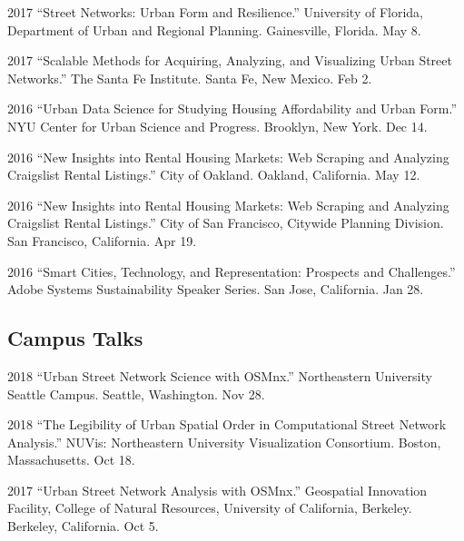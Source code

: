 \documentclass[12pt,letterpaper]{report}
\begin{document}
\begin{tablist}
		\item[2017] \tab \enquote{Street Networks: Urban Form and Resilience.} University of Florida, Department of Urban and Regional Planning. Gainesville, Florida. May 8.

		\item[2017] \tab \enquote{Scalable Methods for Acquiring, Analyzing, and Visualizing Urban Street Networks.} The Santa Fe Institute. Santa Fe, New Mexico. Feb 2.

		\item[2016] \tab \enquote{Urban Data Science for Studying Housing Affordability and Urban Form.} NYU Center for Urban Science and Progress. Brooklyn, New York. Dec 14.

		\item[2016] \tab \enquote{New Insights into Rental Housing Markets: Web Scraping and Analyzing Craigslist Rental Listings.} City of Oakland. Oakland, California. May 12.

		\item[2016] \tab \enquote{New Insights into Rental Housing Markets: Web Scraping and Analyzing Craigslist Rental Listings.} City of San Francisco, Citywide Planning Division. San Francisco, California. Apr 19.

		\item[2016] \tab \enquote{Smart Cities, Technology, and Representation: Prospects and Challenges.} Adobe Systems Sustainability Speaker Series. San Jose, California. Jan 28.

	\end{tablist}

	\subsection*{Campus Talks}

	\begin{tablist}

		\item[2018] \tab \enquote{Urban Street Network Science with OSMnx.} Northeastern University Seattle Campus. Seattle, Washington. Nov 28.

		\item[2018] \tab \enquote{The Legibility of Urban Spatial Order in Computational Street Network Analysis.} NUVis: Northeastern University Visualization Consortium. Boston, Massachusetts. Oct 18.

		\item[2017] \tab \enquote{Urban Street Network Analysis with OSMnx.} Geospatial Innovation Facility, College of Natural Resources, University of California, Berkeley. Berkeley, California. Oct 5.

	\end{tablist}
\end{document}
